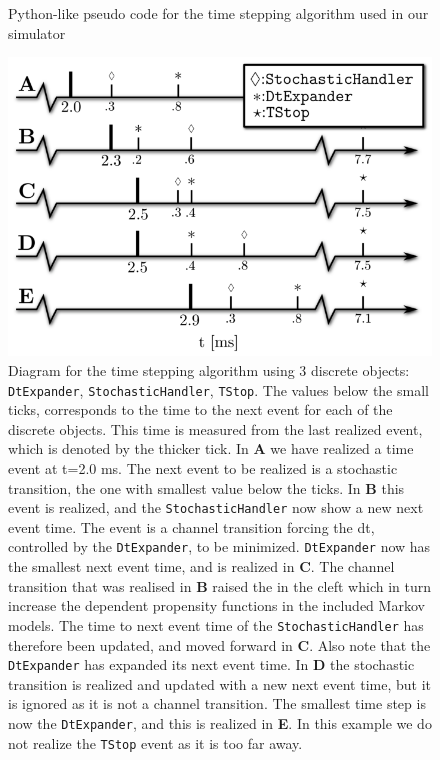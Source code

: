 \label{sec:solution}
\begin{figure}
  \centering
  \vspace{-1.5em}
  \caption{Python-like pseudo code for the time stepping algorithm used in our simulator}
  \label{fig:time-stepping-algorithm}
\end{figure}

\begin{figure}
  \centering
  \includegraphics[width=\smallwidth]{chapters/hake/eps/timeline.eps}
  \caption{Diagram for the time stepping algorithm using 3 discrete objects: \texttt{DtExpander}, \texttt{StochasticHandler}, \texttt{TStop}. The values below the small ticks, corresponds to the time to the next event for each of the discrete objects. This time is measured from the last realized event, which is denoted by the thicker tick. In \textbf{A} we have realized a time event at t=2.0 ms. The next event to be realized is a stochastic transition, the one with smallest value below the ticks. In \textbf{B} this event is realized, and the \texttt{StochasticHandler} now show a new next event time. The event is a channel transition forcing the dt, controlled by the \texttt{DtExpander}, to be minimized. \texttt{DtExpander} now has the smallest next event time, and is realized in \textbf{C}. The channel transition that was realised in \textbf{B} raised the \CaC in the cleft which in turn increase the \Ca dependent propensity functions in the included Markov models. The time to next event time of the \texttt{StochasticHandler} has therefore been updated, and moved forward in \textbf{C}. Also note that the \texttt{DtExpander} has expanded its next event time. In \textbf{D} the stochastic transition is realized and updated with a new next event time, but it is ignored as it is not a channel transition. The smallest time step is now the \texttt{DtExpander}, and this is realized in \textbf{E}. In this example we do not realize the \texttt{TStop} event as it is too far away.}
  \label{fig:time-line}
\end{figure}

